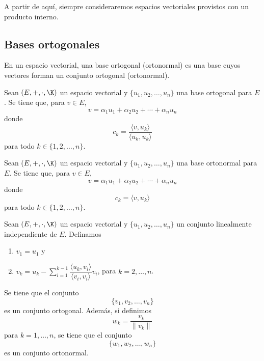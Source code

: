 \documentclass[a4,11pt]{aleph-notas}
\begin{document}

A partir de aquí, siempre consideraremos espacios vectoriales provistos con un producto interno.


\subsection{Bases ortogonales}

\begin{defi}
    En un espacio vectorial, una base ortogonal (ortonormal) es una base cuyos vectores forman un conjunto ortogonal (ortonormal). 
\end{defi}

\begin{teo}
    Sean $(E,+,\cdot,\K)$ un espacio vectorial y $\{u_1, u_2, \ldots, u_n\}$ una base ortogonal para $E$. Se tiene que, para $v \in E$,
    \[
        v = \alpha_1 u_1 + \alpha_2 u_2 +\cdots + \alpha_n u_n
    \]
    donde
    \[
        c_k = \dfrac{\langle v, u_k \rangle}{\langle u_k, u_k \rangle}
    \]
    para todo $k \in \{1, 2, \ldots, n\}$.
\end{teo}


\begin{teo}
    Sean $(E,+,\cdot,\K)$ un espacio vectorial y $\{u_1, u_2, \ldots, u_n\}$ una base ortonormal para $E$. Se tiene que, para $v \in E$,
    \[
        v = \alpha_1 u_1 + \alpha_2 u_2 +\cdots + \alpha_n u_n
    \]
    donde
    \[
        c_k = \langle v, u_k \rangle 
    \]
    para todo $k \in \{1, 2, \ldots, n\}$.
\end{teo}


\begin{teo}
    Sean $(E,+,\cdot,\K)$ un espacio vectorial y $\{u_1, u_2, \ldots, u_n\}$ un conjunto linealmente independiente de $E$. Definamos
    \begin{enumerate}
    \item 
        $v_1 = u_1$ y
    \item
        $\displaystyle v_k = 
            u_k 
            - \sum_{i=1}^{k-1} \dfrac{\langle u_k, v_i\rangle}{\langle v_i,v_i\rangle} v_i$, para $k=2,\ldots,n$.
    \end{enumerate}
    Se tiene que el conjunto
    \[
        \{v_1, v_2, \ldots, v_n\}
    \]
    es un conjunto ortogonal. Además, si definimos
    \[
        w_k = \dfrac{v_k}{\|v_k\|}
    \]
    para $k=1,\ldots,n$, se tiene que el conjunto
    \[
        \{w_1, w_2, \ldots, w_n\}
    \]
    es un conjunto ortonormal.
\end{teo}
\end{document}
